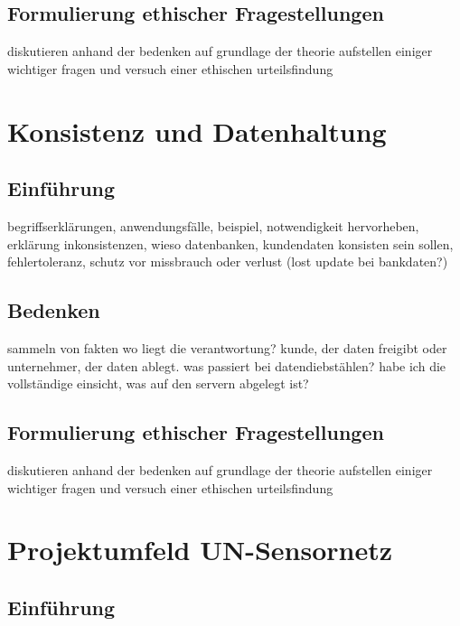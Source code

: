 \documentclass[letterpaper, 12pt]{article}
\let\tempsection\section
\renewcommand\section[1]{\vspace{-0.3cm}\tempsection{#1}\vspace{-0.3cm}}
\let\tempsubsection\subsection
\renewcommand\subsection[1]{\vspace{0cm}\tempsubsection{#1}\vspace{0cm}}
\begin{document}
\subsection{Formulierung ethischer Fragestellungen}

diskutieren anhand der bedenken auf grundlage der theorie \newline
aufstellen einiger wichtiger fragen und versuch einer ethischen urteilsfindung

\clearpage

\section{Konsistenz und Datenhaltung}

\subsection{Einführung}

begriffserklärungen, anwendungsfälle, beispiel, notwendigkeit hervorheben, erklärung inkonsistenzen, wieso datenbanken, kundendaten konsisten sein sollen, fehlertoleranz, schutz vor missbrauch oder verlust (lost update bei bankdaten?)

\subsection{Bedenken}

sammeln von fakten \newline
wo liegt die verantwortung? kunde, der daten freigibt oder unternehmer, der daten ablegt. was passiert bei datendiebstählen? habe ich die vollständige einsicht, was auf den servern abgelegt ist?

\subsection{Formulierung ethischer Fragestellungen}

diskutieren anhand der bedenken auf grundlage der theorie \newline
aufstellen einiger wichtiger fragen und versuch einer ethischen urteilsfindung

\clearpage

\section{Projektumfeld UN-Sensornetz}

\subsection{Einführung}
\end{document}
